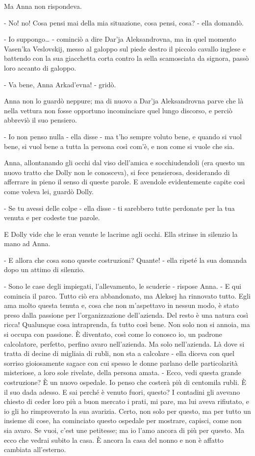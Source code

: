 Ma Anna non rispondeva. 

- No! no! Cosa pensi mai della mia situazione, cosa pensi, cosa? - ella domandò. 

- Io suppongo\ldots{} - cominciò a dire Dar'ja Aleksandrovna, ma in quel momento Vasen'ka Veslovskij, messo al galoppo sul piede destro il piccolo cavallo inglese e battendo con la sua giacchetta corta contro la sella scamosciata da signora, passò loro accanto di galoppo. 

- Va bene, Anna Arkad'evna! - gridò. 

Anna non lo guardò neppure; ma di nuovo a Dar'ja Aleksandrovna parve che là nella vettura non fosse opportuno incominciare quel lungo discorso, e perciò abbreviò il suo pensiero. 

- Io non penso nulla - ella disse - ma t'ho sempre voluto bene, e quando si vuol bene, si vuol bene a tutta la persona così com'è, e non come si vuole che sia. 

Anna, allontanando gli occhi dal viso dell'amica e socchiudendoli (era questo un nuovo tratto che Dolly non le conosceva), si fece pensierosa, desiderando di afferrare in pieno il senso di queste parole. E avendole evidentemente capite così come voleva lei, guardò Dolly. 

- Se tu avessi delle colpe - ella disse - ti sarebbero tutte perdonate per la tua venuta e per codeste tue parole. 

E Dolly vide che le eran venute le lacrime agli occhi. Ella strinse in silenzio la mano ad Anna. 

- E allora che cosa sono queste costruzioni? Quante! - ella ripeté la sua domanda dopo un attimo di silenzio. 

- Sono le case degli impiegati, l'allevamento, le scuderie - rispose Anna. - E qui comincia il parco. Tutto ciò era abbandonato, ma Aleksej ha rinnovato tutto. Egli ama molto questa tenuta e, cosa che non m'aspettavo in nessun modo, è stato preso dalla passione per l'organizzazione dell'azienda. Del resto è una natura così ricca! Qualunque cosa intraprenda, fa tutto così bene. Non solo non si annoia, ma si occupa con passione. È diventato, così come lo conosco io, un padrone calcolatore, perfetto, perfino avaro nell'azienda. Ma solo nell'azienda. Là dove si tratta di decine di migliaia di rubli, non sta a calcolare - ella diceva con quel sorriso gioiosamente sagace con cui spesso le donne parlano delle particolarità misteriose, a loro sole rivelate, della persona amata. - Ecco, vedi questa grande costruzione? È un nuovo ospedale. Io penso che costerà più di centomila rubli. È il suo dada adesso. E sai perché è venuto fuori, questo? I contadini gli avevano chiesto di ceder loro più a buon mercato i prati, mi pare, ma lui aveva rifiutato, e io gli ho rimproverato la sua avarizia. Certo, non solo per questo, ma per tutto un insieme di cose, ha cominciato questo ospedale per mostrare, capisci, come non sia avaro. Se vuoi, c'est une petitesse; ma io l'amo ancora di più per questo. Ma ecco che vedrai subito la casa. È ancora la casa del nonno e non è affatto cambiata all'esterno. 


